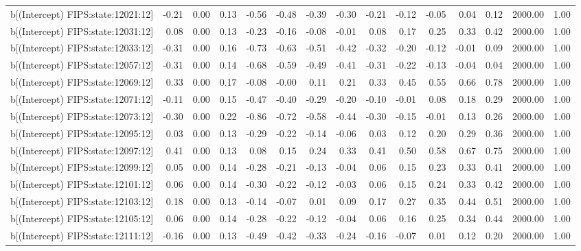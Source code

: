 \begin{table}[ht]
\begin{tabular}{rrrrrrrrrrrrrrr}
  b[(Intercept) FIPS:state:12021:12] & -0.21 & 0.00 & 0.13 & -0.56 & -0.48 & -0.39 & -0.30 & -0.21 & -0.12 & -0.05 & 0.04 & 0.12 & 2000.00 & 1.00 \\ 
  b[(Intercept) FIPS:state:12031:12] & 0.08 & 0.00 & 0.13 & -0.23 & -0.16 & -0.08 & -0.01 & 0.08 & 0.17 & 0.25 & 0.33 & 0.42 & 2000.00 & 1.00 \\ 
  b[(Intercept) FIPS:state:12033:12] & -0.31 & 0.00 & 0.16 & -0.73 & -0.63 & -0.51 & -0.42 & -0.32 & -0.20 & -0.12 & -0.01 & 0.09 & 2000.00 & 1.00 \\ 
  b[(Intercept) FIPS:state:12057:12] & -0.31 & 0.00 & 0.14 & -0.68 & -0.59 & -0.49 & -0.41 & -0.31 & -0.22 & -0.13 & -0.04 & 0.04 & 2000.00 & 1.00 \\ 
  b[(Intercept) FIPS:state:12069:12] & 0.33 & 0.00 & 0.17 & -0.08 & -0.00 & 0.11 & 0.21 & 0.33 & 0.45 & 0.55 & 0.66 & 0.78 & 2000.00 & 1.00 \\ 
  b[(Intercept) FIPS:state:12071:12] & -0.11 & 0.00 & 0.15 & -0.47 & -0.40 & -0.29 & -0.20 & -0.10 & -0.01 & 0.08 & 0.18 & 0.29 & 2000.00 & 1.00 \\ 
  b[(Intercept) FIPS:state:12073:12] & -0.30 & 0.00 & 0.22 & -0.86 & -0.72 & -0.58 & -0.44 & -0.30 & -0.15 & -0.01 & 0.13 & 0.26 & 2000.00 & 1.00 \\ 
  b[(Intercept) FIPS:state:12095:12] & 0.03 & 0.00 & 0.13 & -0.29 & -0.22 & -0.14 & -0.06 & 0.03 & 0.12 & 0.20 & 0.29 & 0.36 & 2000.00 & 1.00 \\ 
  b[(Intercept) FIPS:state:12097:12] & 0.41 & 0.00 & 0.13 & 0.08 & 0.15 & 0.24 & 0.33 & 0.41 & 0.50 & 0.58 & 0.67 & 0.75 & 2000.00 & 1.00 \\ 
  b[(Intercept) FIPS:state:12099:12] & 0.05 & 0.00 & 0.14 & -0.28 & -0.21 & -0.13 & -0.04 & 0.06 & 0.15 & 0.23 & 0.33 & 0.41 & 2000.00 & 1.00 \\ 
  b[(Intercept) FIPS:state:12101:12] & 0.06 & 0.00 & 0.14 & -0.30 & -0.22 & -0.12 & -0.03 & 0.06 & 0.15 & 0.24 & 0.33 & 0.42 & 2000.00 & 1.00 \\ 
  b[(Intercept) FIPS:state:12103:12] & 0.18 & 0.00 & 0.13 & -0.14 & -0.07 & 0.01 & 0.09 & 0.17 & 0.27 & 0.35 & 0.44 & 0.51 & 2000.00 & 1.00 \\ 
  b[(Intercept) FIPS:state:12105:12] & 0.06 & 0.00 & 0.14 & -0.28 & -0.22 & -0.12 & -0.04 & 0.06 & 0.16 & 0.25 & 0.34 & 0.44 & 2000.00 & 1.00 \\ 
  b[(Intercept) FIPS:state:12111:12] & -0.16 & 0.00 & 0.13 & -0.49 & -0.42 & -0.33 & -0.24 & -0.16 & -0.07 & 0.01 & 0.12 & 0.20 & 2000.00 & 1.00 \\ 

\end{tabular}
\end{table}
